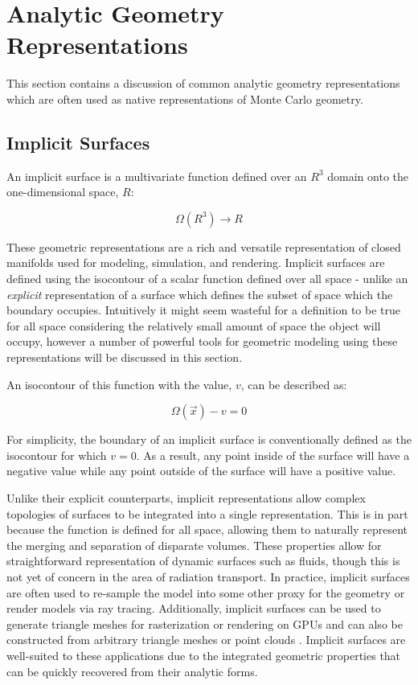 \section{Analytic Geometry Representations}\label{sec:analytic_geometry}

This section contains a discussion of common analytic geometry  representations
which are often used as native representations of Monte Carlo geometry.

\subsection{Implicit Surfaces}\label{subsec:implicit_surfaces}

An implicit surface is a multivariate function defined over an $ R^3 $ domain
onto the one-dimensional space, $ R $:

\begin{equation}
    \Omega(R^3)\rightarrow R
\end{equation}

These geometric representations are a rich and versatile representation of
closed manifolds used for modeling, simulation, and rendering. Implicit surfaces
are defined using the isocontour of a scalar function defined over all space -
unlike an \textit{explicit} representation of a surface which defines the subset
of space which the boundary occupies. Intuitively it might seem wasteful for a
definition to be true for all space considering the relatively small amount of
space the object will occupy, however a number of powerful tools for geometric
modeling using these representations will be discussed in this section.

An isocontour of this function with the value, $v$, can be described as:

\begin{equation}
  \Omega(\vec{x}) - v  = 0 
\end{equation}

For simplicity, the boundary of an implicit surface is conventionally defined as
the isocontour for which $v=0$. As a result, any point inside of the surface
will have a negative value while any point outside of the surface will have a
positive value.

Unlike their explicit counterparts, implicit representations allow complex
topologies of surfaces to be integrated into a single representation. This is in
part because the function is defined for all space, allowing them to naturally
represent the merging and separation of disparate volumes. These properties
allow for straightforward representation of dynamic surfaces such as fluids,
though this is not yet of concern in the area of radiation transport. In
practice, implicit surfaces are often used to re-sample the model into some
other proxy for the geometry or render models via ray tracing. Additionally,
implicit surfaces can be used to generate triangle meshes for rasterization or
rendering on GPUs \cite{Sethian_1996} and can also be constructed from arbitrary
triangle meshes or point clouds \cite{Sigg_2006}. Implicit surfaces are
well-suited to these applications due to the integrated geometric properties
that can be quickly recovered from their analytic forms.

